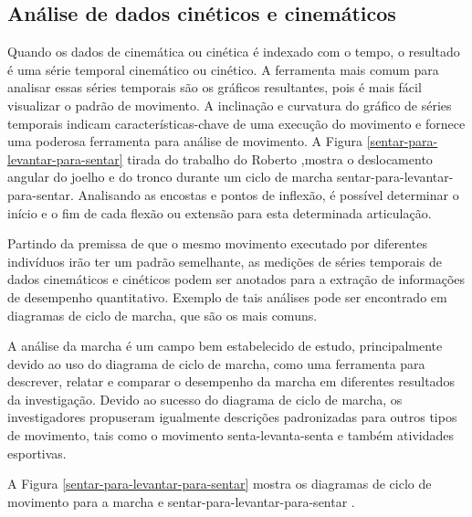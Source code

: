 \subsection{Análise de dados cinéticos e cinemáticos}
Quando os dados de cinemática ou cinética é indexado com o tempo, o resultado é uma série temporal cinemático
 ou cinético. A ferramenta mais comum para analisar essas séries temporais são os
gráficos resultantes, pois é mais fácil visualizar o padrão de movimento. A inclinação e
curvatura do gráfico de séries temporais indicam características-chave de uma
 execução do movimento e fornece uma poderosa ferramenta para análise de movimento. 
A Figura \ref{sentar-para-levantar-para-sentar} tirada do trabalho do Roberto \cite{roberto},mostra o deslocamento angular do
joelho e do tronco durante um ciclo de marcha sentar-para-levantar-para-sentar. Analisando as encostas e pontos de inflexão, é
possível determinar o início e o fim de cada flexão ou extensão para esta determinada
articulação.

Partindo da premissa de que o mesmo movimento executado por diferentes indivíduos irão
ter um padrão semelhante, as medições de séries temporais de dados cinemáticos e
 cinéticos podem ser anotados para a extração de informações de 
desempenho quantitativo. Exemplo de tais análises pode ser encontrado em diagramas de ciclo de marcha, que são os mais comuns. 

A análise da marcha é um campo bem estabelecido de estudo, principalmente devido 
ao uso do diagrama de ciclo de marcha, como uma ferramenta para descrever,
relatar e comparar o desempenho da marcha em diferentes resultados da investigação. 
Devido ao sucesso do diagrama de ciclo de marcha, os investigadores propuseram igualmente descrições padronizadas para
outros tipos de movimento, tais como o movimento senta-levanta-senta e também atividades esportivas.

A Figura \ref{sentar-para-levantar-para-sentar} mostra os diagramas de ciclo de movimento para a marcha e sentar-para-levantar-para-sentar .

